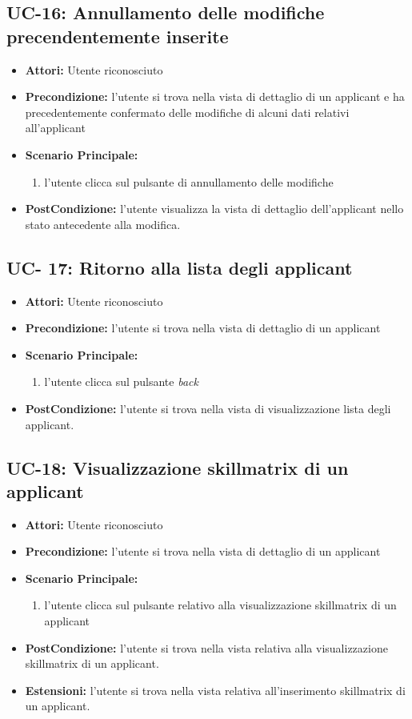 \subsection{UC-16: Annullamento delle modifiche precendentemente inserite}
\begin{itemize}
\item \textbf{Attori:} Utente riconosciuto
\item \textbf{Precondizione:} l'utente si trova nella vista di dettaglio di un applicant e ha precedentemente confermato delle modifiche di alcuni dati relativi all'applicant
\item \textbf{Scenario Principale:}
\begin{enumerate}
	\item l'utente clicca sul pulsante di annullamento delle modifiche
\end{enumerate}
\item \textbf{PostCondizione:} l'utente visualizza la vista di dettaglio dell'applicant nello stato antecedente alla modifica.
\end{itemize}

\subsection{UC- 17: Ritorno alla lista degli applicant }
\begin{itemize}
\item \textbf{Attori:} Utente riconosciuto
\item \textbf{Precondizione:} l'utente si trova nella vista di dettaglio di un applicant
\item \textbf{Scenario Principale:}
\begin{enumerate}
	\item l'utente clicca sul pulsante \textit{back}
\end{enumerate}
\item \textbf{PostCondizione:} l'utente si trova nella vista di visualizzazione lista degli applicant.
\end{itemize}

\subsection{UC-18: Visualizzazione skillmatrix di un applicant}
\begin{itemize}
\item \textbf{Attori:} Utente riconosciuto
\item \textbf{Precondizione:}  l'utente si trova nella vista di dettaglio di un applicant
\item \textbf{Scenario Principale:}
\begin{enumerate}
	\item l'utente clicca sul pulsante relativo alla visualizzazione skillmatrix di un applicant
\end{enumerate}
\item \textbf{PostCondizione:} l'utente si trova nella vista relativa alla visualizzazione skillmatrix di un applicant.
\item \textbf{Estensioni:} l'utente si trova nella vista relativa all'inserimento skillmatrix di un applicant.
\end{itemize}